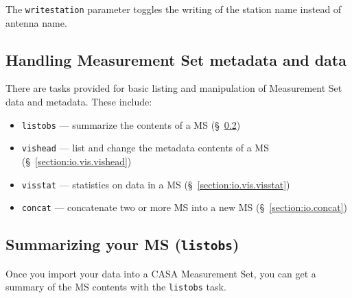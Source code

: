 The {\tt writestation} parameter toggles the writing of the station
name instead of antenna name.

\subsection{Handling Measurement Set metadata and data}
\label{section:io.vis}

There are tasks provided for basic listing and manipulation of
Measurement Set data and metadata.  These include:
\begin{itemize}
   \item {\tt listobs} --- summarize the contents of a MS 
         (\S~\ref{section:io.list})
   \item {\tt vishead} --- list and change the metadata contents of a MS 
         (\S~\ref{section:io.vis.vishead})
   \item {\tt visstat} --- statistics on data in a MS 
         (\S~\ref{section:io.vis.visstat})
   \item {\tt concat} --- concatenate two or more MS into a
         new MS (\S~\ref{section:io.concat})
\end{itemize}

\subsection{Summarizing your MS ({\tt listobs})}
\label{section:io.list}

Once you import your data into a CASA Measurement Set, you can
get a summary of the MS contents with the {\tt listobs} task.

